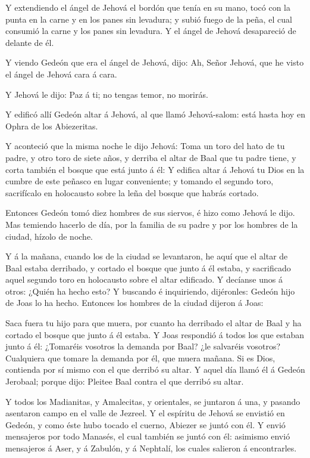  Y extendiendo el ángel de Jehová el bordón que tenía en su
mano, tocó con la punta en la carne y en los panes sin levadura; y subió
fuego de la peña, el cual consumió la carne y los panes sin levadura. Y
el ángel de Jehová desapareció de delante de él.

 Y viendo Gedeón que era el ángel de Jehová, dijo: Ah,
Señor Jehová, que he visto el ángel de Jehová cara á cara.

 Y Jehová le dijo: Paz á ti; no tengas temor, no morirás.

 Y edificó allí Gedeón altar á Jehová, al que llamó
Jehová-salom: está hasta hoy en Ophra de los Abiezeritas.

 Y aconteció que la misma noche le dijo Jehová: Toma un
toro del hato de tu padre, y otro toro de siete años, y derriba el altar
de Baal que tu padre tiene, y corta también el bosque que está junto á
él:  Y edifica altar á Jehová tu Dios en la cumbre de este
peñasco en lugar conveniente; y tomando el segundo toro, sacrifícalo en
holocausto sobre la leña del bosque que habrás cortado.

 Entonces Gedeón tomó diez hombres de sus siervos, é hizo
como Jehová le dijo. Mas temiendo hacerlo de día, por la familia de su
padre y por los hombres de la ciudad, hízolo de noche.

 Y á la mañana, cuando los de la ciudad se levantaron, he
aquí que el altar de Baal estaba derribado, y cortado el bosque que
junto á él estaba, y sacrificado aquel segundo toro en holocausto sobre
el altar edificado.  Y decíanse unos á otros: ¿Quién ha
hecho esto? Y buscando é inquiriendo, dijéronles: Gedeón hijo de Joas lo
ha hecho. Entonces los hombres de la ciudad dijeron á Joas:

 Saca fuera tu hijo para que muera, por cuanto ha derribado
el altar de Baal y ha cortado el bosque que junto á él estaba.
 Y Joas respondió á todos los que estaban junto á él:
¿Tomaréis vosotros la demanda por Baal? ¿le salvaréis vosotros?
Cualquiera que tomare la demanda por él, que muera mañana. Si es Dios,
contienda por sí mismo con el que derribó su altar.  Y
aquel día llamó él á Gedeón Jerobaal; porque dijo: Pleitee Baal contra
el que derribó su altar.

 Y todos los Madianitas, y Amalecitas, y orientales, se
juntaron á una, y pasando asentaron campo en el valle de Jezreel.
 Y el espíritu de Jehová se envistió en Gedeón, y como éste
hubo tocado el cuerno, Abiezer se juntó con él.  Y envió
mensajeros por todo Manasés, el cual también se juntó con él: asimismo
envió mensajeros á Aser, y á Zabulón, y á Nephtalí, los cuales salieron
á encontrarles.

